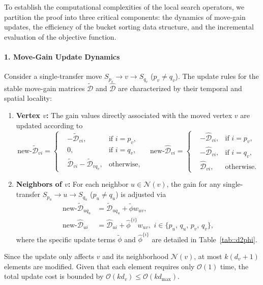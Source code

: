 \documentclass[12pt, a4paper]{article}%
\numberwithin{equation}{section}
\theoremstyle{plain}
\begin{document}
			
		
		To establish the computational complexities of the local search operators, we partition the proof into three critical components: the dynamics of move-gain updates, the efficiency of the bucket sorting data structure, and the incremental evaluation of the objective function.
		
		\paragraph{1. Move-Gain Update Dynamics}
		Consider a single-transfer move $S_{p_v} \to v \to S_{q_v}$ ($p_v \neq q_v$). The update rules for the stable move-gain matrices $\widetilde{\mathcal{D}}$ and $\widehat{\mathcal{D}}$ are characterized by their temporal and spatial locality:
		\begin{enumerate}
			\item \textbf{Vertex $v$:} The gain values directly associated with the moved vertex $v$ are updated according to $$ \text{new-}\widetilde{\mathcal{D}}_{vi}=\left\{
			\begin{aligned}
				&-\widetilde{\mathcal{D}}_{vi},& \text{if }i=p_v,\\
				& 0,&\text{if }i=q_v,\\
				&\widetilde{\mathcal{D}}_{vi}-\widetilde{\mathcal{D}}_{v{q_v}},&\text{otherwise},
			\end{aligned}
			\right.
			\quad 
			\text{new-}\widehat{\mathcal{D}}_{vi}=
			\left\{
			\begin{aligned}
				&-\widehat{\mathcal{D}}_{vi},& \text{if } i=p_v,\\
				&-\widehat{\mathcal{D}}_{vi},& \text{if } i=q_v,\\
				& \widehat{\mathcal{D}}_{vi}, & \text{otherwise}.
			\end{aligned}
			\right.
			$$	
			\item \textbf{Neighbors of $v$:} For each neighbor $u \in \mathcal{N}(v)$, the gain for any single-transfer $S_{p_u} \to u \to S_{q_u}$ ($p_u \neq q_u$) is adjusted via 	\begin{align}
				\text{new-}\widetilde{\mathcal{D}}_{u{q_u}}&=\widetilde{\mathcal{D}}_{u{q_u}}+\widetilde{\phi} w_{uv},	\label{adjust::dcut}\\
				\text{new-}\widehat{\mathcal{D}}_{ui}&=\widehat{\mathcal{D}}_{ui}+\widehat{\phi}^{\{i\}} w_{uv},\,\, i\in\{p_u,\,q_u,\,p_v,\,q_v\},	\label{adjust::dpartial}
			\end{align} where the specific update terms $\widetilde{\phi}$ and $\widehat{\phi}^{\{i\}}$ are detailed in Table~\ref{tab::d2phi}.
		\end{enumerate}
		Since the update only affects $v$ and its neighborhood $\mathcal{N}(v)$, at most $k(d_v+1)$ elements are modified. Given that each element requires only $\mathcal{O}(1)$ time, the total update cost is bounded by $\mathcal{O}(kd_v) \le \mathcal{O}(kd_{\max})$.
		
\end{document}
